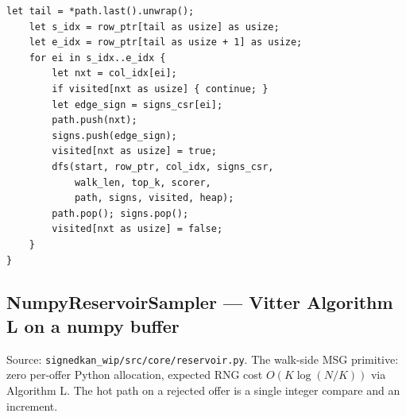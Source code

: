 \documentclass[11pt]{article}
\begin{document}
\begin{lstlisting}[style=ruststyle]
    let tail = *path.last().unwrap();
    let s_idx = row_ptr[tail as usize] as usize;
    let e_idx = row_ptr[tail as usize + 1] as usize;
    for ei in s_idx..e_idx {
        let nxt = col_idx[ei];
        if visited[nxt as usize] { continue; }
        let edge_sign = signs_csr[ei];
        path.push(nxt);
        signs.push(edge_sign);
        visited[nxt as usize] = true;
        dfs(start, row_ptr, col_idx, signs_csr,
            walk_len, top_k, scorer,
            path, signs, visited, heap);
        path.pop(); signs.pop();
        visited[nxt as usize] = false;
    }
}
\end{lstlisting}

\subsection{NumpyReservoirSampler --- Vitter Algorithm L on a numpy buffer}
\label{app:code-reservoir}

Source: \texttt{signedkan\_wip/src/core/reservoir.py}. The walk-side
MSG primitive: zero per-offer Python allocation, expected RNG cost
$O(K \log(N/K))$ via Algorithm L. The hot path on a rejected offer
is a single integer compare and an increment.
\end{document}
